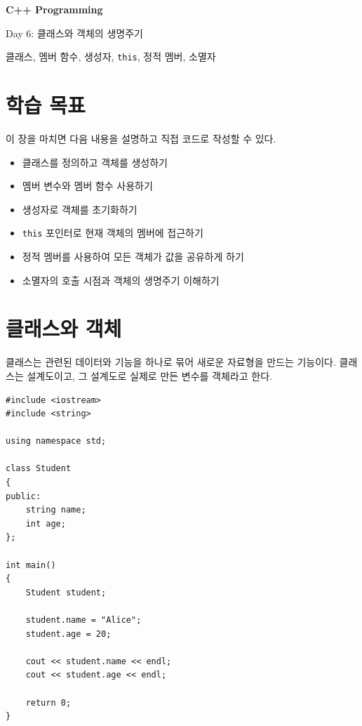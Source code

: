 \documentclass[11pt,a4paper]{article}
\begin{document}
\begin{titlepage}
    \centering
    \vspace*{3cm}
    {\Huge\bfseries C++ Programming\par}
    \vspace{0.8cm}
    {\LARGE Day 6: 클래스와 객체의 생명주기\par}
    \vspace{2cm}
    {\large 클래스, 멤버 함수, 생성자, \texttt{this}, 정적 멤버, 소멸자\par}
    \vfill
\end{titlepage}

\tableofcontents
\newpage

\section{학습 목표}
\begin{learningbox}
이 장을 마치면 다음 내용을 설명하고 직접 코드로 작성할 수 있다.
\begin{itemize}[leftmargin=1.5em]
    \item 클래스를 정의하고 객체를 생성하기
    \item 멤버 변수와 멤버 함수 사용하기
    \item 생성자로 객체를 초기화하기
    \item \texttt{this} 포인터로 현재 객체의 멤버에 접근하기
    \item 정적 멤버를 사용하여 모든 객체가 값을 공유하게 하기
    \item 소멸자의 호출 시점과 객체의 생명주기 이해하기
\end{itemize}
\end{learningbox}

\section{클래스와 객체}
클래스는 관련된 데이터와 기능을 하나로 묶어 새로운 자료형을 만드는 기능이다. 클래스는 설계도이고, 그 설계도로 실제로 만든 변수를 객체라고 한다.

\begin{lstlisting}
#include <iostream>
#include <string>

using namespace std;

class Student
{
public:
    string name;
    int age;
};

int main()
{
    Student student;

    student.name = "Alice";
    student.age = 20;

    cout << student.name << endl;
    cout << student.age << endl;

    return 0;
}
\end{lstlisting}
\end{document}
